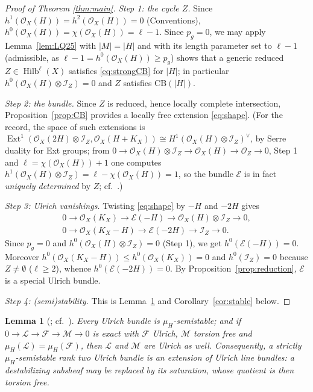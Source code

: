 \documentclass{amsart}
\newtheorem{lemma}[theorem]{Lemma}
\theoremstyle{definition}
\newcommand{\OO}{\mathcal{O}}
\newcommand{\EE}{\mathcal{E}}
\newcommand{\FF}{\mathcal{F}}
\newcommand{\II}{\mathcal{I}}
\newcommand{\Hilb}{\operatorname{Hilb}}
\newcommand{\Ext}{\operatorname{Ext}}
\newcommand{\len}{\ell}
\begin{document}
\begin{proof}[Proof of Theorem \textup{\ref{thm:main}}]
\emph{Step 1: the cycle $Z$.} Since $h^1(\OO_X(H))=h^2(\OO_X(H))=0$ (Conventions), $h^0(\OO_X(H))=\chi(\OO_X(H))=\len-1$. Since $p_g=0$, we may apply Lemma~\ref{lem:LQ25} with $|M|=|H|$ and with its length parameter set to $\len-1$ (admissible, as $\len-1=h^0(\OO_X(H))\ge p_g$) shows that a generic reduced $Z\in\Hilb^{\len}(X)$ satisfies \eqref{eq:strongCB} for $|H|$; in particular $h^0(\OO_X(H)\otimes\II_Z)=0$ and $Z$ satisfies CB$(|H|)$.

\smallskip
\noindent \emph{Step 2: the bundle.} Since $Z$ is reduced, hence locally complete intersection, Proposition~\ref{prop:CB} provides a locally free extension \eqref{eq:shape}. (For the record, the space of such extensions is
$\Ext^1(\OO_X(2H)\otimes\II_Z,\OO_X(H+K_X))\cong H^1(\OO_X(H)\otimes\II_Z)^\vee$,
by Serre duality for Ext groups; from $0\to\OO_X(H)\otimes\II_Z\to\OO_X(H)\to\OO_Z\to 0$, Step 1 and $\len=\chi(\OO_X(H))+1$ one computes $h^1(\OO_X(H)\otimes\II_Z)=\len-\chi(\OO_X(H))=1$, so the bundle $\EE$ is in fact \emph{uniquely determined} by $Z$; cf.\ \cite[Rem.~3.4]{Cas17}.)

\smallskip
\noindent \emph{Step 3: Ulrich vanishings.} Twisting \eqref{eq:shape} by $-H$ and $-2H$ gives
\begin{gather*}
0\to\OO_X(K_X)\to\EE(-H)\to\OO_X(H)\otimes\II_Z\to 0,\\
0\to\OO_X(K_X-H)\to\EE(-2H)\to\II_Z\to 0 .
\end{gather*}
Since $p_g=0$ and $h^0(\OO_X(H)\otimes\II_Z)=0$ (Step 1), we get $h^0(\EE(-H))=0$. Moreover $h^0(\OO_X(K_X-H))\le h^0(\OO_X(K_X))=0$ and $h^0(\II_Z)=0$ because $Z\neq\emptyset$ ($\len\ge 2$), whence $h^0(\EE(-2H))=0$. By Proposition~\ref{prop:reduction}, $\EE$ is a special Ulrich bundle.

\smallskip
\noindent \emph{Step 4: (semi)stability.} This is Lemma~\ref{lem:semistable} and Corollary~\ref{cor:stable} below.
\end{proof}

\begin{lemma}[{\cite[Thm.~2.9]{CHGS12}}; cf.\ {\cite[Thm.~4.1(3)]{Cas17}}]\label{lem:semistable}
Every Ulrich bundle is $\mu_H$-semistable; and if $0\to\mathcal L\to\FF\to\mathcal M\to0$ is exact with $\FF$ Ulrich, $\mathcal M$ torsion free and $\mu_H(\mathcal L)=\mu_H(\FF)$, then $\mathcal L$ and $\mathcal M$ are Ulrich as well. Consequently, a strictly $\mu_H$-semistable rank two Ulrich bundle is an extension of Ulrich line bundles: a destabilizing subsheaf may be replaced by its saturation, whose quotient is then torsion free.
\end{lemma}
\end{document}
